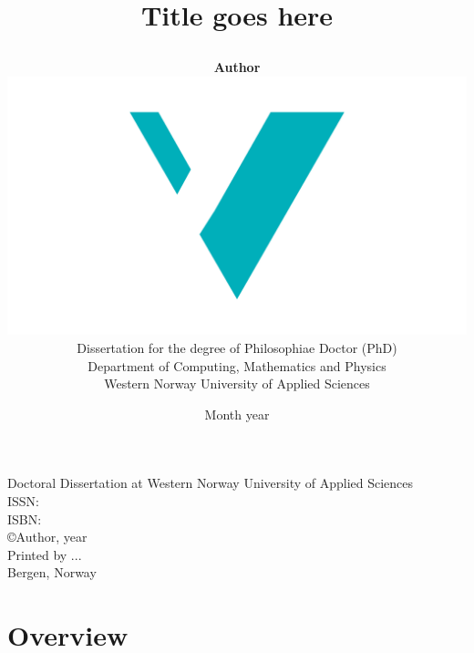 \documentclass[10pt]{book}
\title{
{\fontsize{28}{30}\usefont{OT1}{phv}{bc}{n}\selectfont Title goes here}
	\author{
	\textbf{Author}\vspace{3cm}\\
		\includegraphics[scale=0.36]{logos/logo.pdf}\vspace{1em}\\
		Dissertation for the degree of Philosophiae Doctor (PhD)\vspace{3.5em}\\
		Department of Computing, Mathematics and Physics \\
		Western Norway University of Applied Sciences
	}
	\date{Month year}
}
\begin{document}

\ifDownscaledFinalDoc
	\fontsize{\TextSize}{\BaseLineSkip}
	\selectfont
\fi

\ifDraft
	\doublespacing
\fi


\maketitle
\normalsize\vspace*{15cm}
\begin{minipage}{13cm}
Doctoral Dissertation at Western Norway University of Applied Sciences\\
ISSN: \\ %
ISBN: \\[2ex] %
\copyright{Author}, year\\[2ex] %
Printed by ...\\
Bergen, Norway
\end{minipage}

\frontmatter
\tableofcontents





\mainmatter

%
%
\part{Overview}
\label{part:1}



%
%
%


\end{document}
